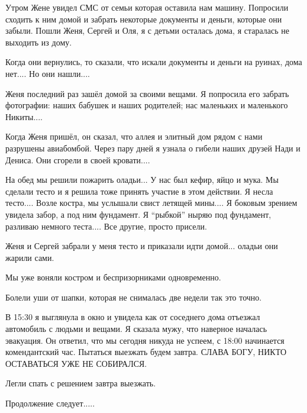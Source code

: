 Утром Жене увидел СМС от семьи которая оставила нам машину. Попросили сходить к
ним домой и забрать некоторые документы и деньги, которые они забыли. Пошли
Женя, Сергей и Оля, я с детьми осталась дома, я старалась не выходить из дому. 

Когда они вернулись, то сказали, что искали документы и деньги на руинах, дома
нет.... Но они нашли....

Женя последний раз зашёл домой за своими вещами. Я попросила его забрать
фотографии: наших бабушек и наших родителей; нас маленьких и маленького
Никиты....

Когда Женя пришёл, он сказал, что аллея и элитный дом рядом с нами разрушены
авиабомбой. Через пару дней я узнала о гибели наших друзей Нади и Дениса. Они
сгорели в своей кровати.... 

На обед мы решили пожарить оладьи... У нас был кефир, яйцо и мука. Мы сделали
тесто и я решила тоже принять участие в этом действии. Я несла тесто.... Возле
костра, мы услышали свист летящей мины.... Я боковым зрением увидела забор, а под
ним фундамент. Я \enquote{рыбкой} ныряю под фундамент, разливаю немного теста.... Все
другие, просто присели.

Женя и Сергей забрали у меня тесто и приказали идти домой... оладьи они жарили
сами. 

Мы уже воняли костром и беспризорниками одновременно. 

Болели уши от шапки, которая не снималась две недели так это точно.

В 15:30 я выглянула в окно и увидела как от соседнего дома отъезжал автомобиль
с людьми и вещами. Я сказала мужу, что наверное началась эвакуация. Он ответил,
что мы сегодня никуда не успеем, с 18:00 начинается комендантский час. Пытаться
выезжать будем завтра. СЛАВА БОГУ, НИКТО ОСТАВАТЬСЯ УЖЕ НЕ СОБИРАЛСЯ. 

Легли спать с решением завтра выезжать.

Продолжение следует.....

